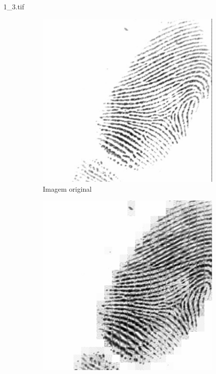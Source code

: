 \documentclass{beamer}
\begin{document}
    \begin{frame}{1\_3.tif}
        \begin{figure}
            \centering
            \begin{subfigure}[!ht]{0.32\textwidth}
                \includegraphics[width=\columnwidth]{Fingerprints/1_3.jpg}
                \caption{Imagem original}
            \end{subfigure}
            \begin{subfigure}[!ht]{0.32\textwidth}
                \includegraphics[width=\columnwidth]{Fingerprints/1_3_intermediate.jpg}

\end{subfigure}
\end{figure}
\end{frame}
\end{document}
